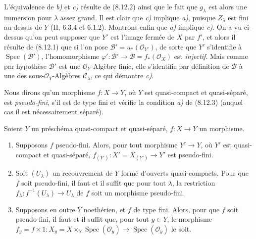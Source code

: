 L'équivalence de \emph{b)} et \emph{c)} résulte de (8.12.2) ainsi que le fait
que $g_\lambda$ est alors une immersion pour $\lambda$ assez grand. Il est
clair que \emph{c)} implique \emph{a)}, puisque $Z_\lambda$ est fini
au-dessus de $Y$ (II, 6.3.4 et 6.1.2). Montrons enfin que \emph{a)} implique
\emph{c)}. On a vu ci-dessus qu'on peut supposer que $Y'$ est l'image fermée
de $X$ par $f'$, et alors il résulte de (8.12.1) que si l'on pose
$\mathcal B'=u_*(\mathcal O_{Y'})$, de sorte que $Y'$ s'identifie à
$\operatorname{Spec}(\mathcal B')$, l'homomorphisme
$\varphi':\mathcal B'\to\mathcal B=f_*(\mathcal O_X)$ est \emph{injectif}.
Mais comme par hypothèse $\mathcal B'$ est une $\mathcal O_Y$-Algèbre finie,
elle s'identifie par définition de $\mathcal B$ à une des
sous-$\mathcal O_Y$-Algèbres $\mathcal C_\lambda$, ce qui démontre
\emph{c)}.

Nous dirons qu'un morphisme $f:X\to Y$, où $Y$ est quasi-compact et
quasi-séparé, est \emph{pseudo-fini}, s'il est de type fini et vérifie la
condition \emph{a)} de (8.12.3) (auquel cas il est nécessairement séparé).

\begin{corollary}[8.12.4]
\label{IV.8.12.4-fr}
Soient $Y$ un préschéma quasi-compact et quasi-séparé, $f:X\to Y$ un
morphisme.
\begin{enumerate}
\item[(i)] Supposons $f$ pseudo-fini. Alors, pour tout morphisme $Y'\to Y$,
où $Y'$ est quasi-compact et quasi-séparé,
$f_{(Y')}:X'=X_{(Y')}\to Y'$ est pseudo-fini.
\item[(ii)] Soit $(U_\lambda)$ un recouvrement de $Y$ formé d'ouverts
quasi-compacts. Pour que $f$ soit pseudo-fini, il faut et il suffit que pour
tout $\lambda$, la restriction
$f_\lambda:f^{-1}(U_\lambda)\to U_\lambda$ de $f$ soit un morphisme
pseudo-fini.
\item[(iii)] Supposons en outre $Y$ noethérien, et $f$ de type fini. Alors,
pour que $f$ soit pseudo-fini, il faut et il suffit que, pour tout $y\in Y$,
le morphisme
$f_y=f\times 1:X_y=X\times_Y\operatorname{Spec}(\mathcal O_y)
\to\operatorname{Spec}(\mathcal O_y)$ le soit.
\end{enumerate}
\end{corollary}

